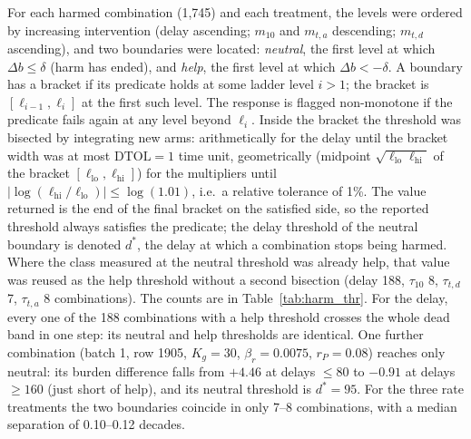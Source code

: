 \documentclass[11pt]{article}
\begin{document}
For each harmed combination (1,745) and each treatment, the levels were ordered
by increasing intervention (delay ascending; $m_{10}$ and $m_{t,a}$ descending; $m_{t,d}$
ascending), and two boundaries were located: \emph{neutral}, the first level at
which $\Delta b\le\delta$ (harm has ended), and \emph{help}, the first level at
which $\Delta b<-\delta$. A boundary has a bracket if its predicate holds at some
ladder level $i>1$; the bracket is $[\ell_{i-1},\ell_i]$ at the first such level.
The response is flagged non-monotone if the predicate fails again at any level
beyond $\ell_i$. Inside the bracket the threshold was bisected by integrating
new arms: arithmetically for the delay until the bracket width was at most
$\mathrm{DTOL}=1$ time unit, geometrically (midpoint $\sqrt{\ell_{\mathrm{lo}}\ell_{\mathrm{hi}}}$ of the bracket
$[\ell_{\mathrm{lo}},\ell_{\mathrm{hi}}]$) for the multipliers until
$|\log(\ell_{\mathrm{hi}}/\ell_{\mathrm{lo}})|\le\log(1.01)$, i.e.\ a relative tolerance of 1\%.
The value returned is the end of the final bracket on the satisfied side, so the
reported threshold always satisfies the predicate; the delay threshold of the
neutral boundary is denoted $d^\ast$, the delay at which a combination stops
being harmed. Where the class measured at the neutral threshold was already help,
that value was reused as the help threshold without a second bisection
(delay 188, $\tau_{10}$ 8, $\tau_{t,d}$ 7, $\tau_{t,a}$ 8 combinations).
The counts are in Table~\ref{tab:harm_thr}. For the delay, every one of the 188
combinations with a help threshold crosses the whole dead band in one step:
its neutral and help thresholds are identical. One further combination
(batch 1, row 1905, $K_g=30$, $\beta_r=0.0075$, $r_P=0.08$)
reaches only neutral: its burden difference falls from $+4.46$ at delays
$\le80$ to $-0.91$ at delays $\ge160$ (just short of help), and its neutral
threshold is $d^\ast=95$. For the three rate treatments the two boundaries coincide in
only 7--8 combinations, with a median separation of 0.10--0.12 decades.
\end{document}
